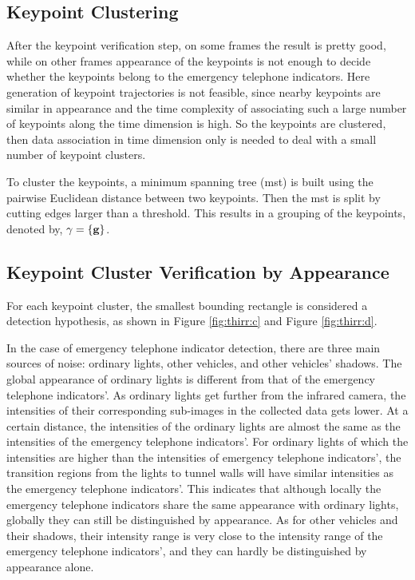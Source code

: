 \subsection{Keypoint Clustering}

After the keypoint verification step, on some frames the result is pretty good, while on other frames appearance of the keypoints is not enough to decide whether the keypoints belong to the emergency telephone indicators. Here generation of keypoint trajectories is not feasible, since nearby keypoints are similar in appearance and  the time complexity of associating such a large number of keypoints along the time dimension is high. So the keypoints are clustered, then data association in time dimension only is needed to deal with a small number of keypoint clusters.

To cluster the keypoints, a minimum spanning tree (mst) is built using the pairwise Euclidean distance between two keypoints. Then the mst is split by cutting edges larger than a threshold. This results in a grouping  of the keypoints, denoted by, $\gamma=\{\bf{g}\}$.



\subsection{Keypoint Cluster Verification by Appearance}


For each keypoint cluster, the smallest bounding rectangle is considered a detection hypothesis, as shown in Figure \ref{fig:thirr:c} and Figure \ref{fig:thirr:d}.

In the case of emergency telephone indicator detection, there are three main sources of noise: ordinary lights, other vehicles, and other vehicles' shadows. The global appearance of ordinary lights is different from that of the emergency telephone indicators'. As ordinary lights get further from the infrared camera, the intensities of their corresponding sub-images in the collected data gets lower. At a certain distance, the intensities of the ordinary lights are almost the same as the intensities of the emergency telephone indicators'. For ordinary lights of which the intensities are higher than the intensities of emergency telephone indicators', the transition regions from the lights to tunnel walls will have similar intensities as the emergency telephone indicators'.
This indicates that although locally the emergency telephone indicators share the same appearance with ordinary lights, globally they can still be distinguished by appearance. As for other vehicles and their shadows, their intensity range is very close to the intensity range of the emergency telephone indicators', and they can hardly be distinguished by appearance alone.

